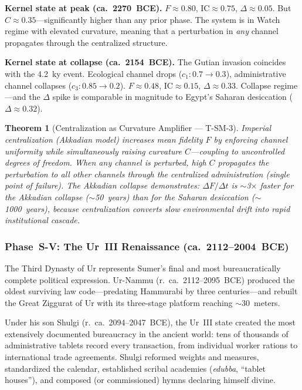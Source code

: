 \documentclass[
  aps,
  prd,
  twocolumn,
  superscriptaddress,
  nofootinbib,
  floatfix
]{revtex4-2}
\newtheorem{theorem}{Theorem}
\newcommand{\IC}{\mathrm{IC}}
\begin{document}
\textbf{Kernel state at peak (ca.\ 2270~BCE).}
$F \approx 0.80$, $\IC \approx 0.75$, $\Delta
\approx 0.05$.  But $C \approx 0.35$---significantly
higher than any prior phase.  The system is in Watch
regime with elevated curvature, meaning that a
perturbation in \emph{any} channel propagates through
the centralized structure.

\textbf{Kernel state at collapse (ca.\ 2154~BCE).}
The Gutian invasion coincides with the 4.2~ky event.
Ecological channel drops ($c_1: 0.7 \to 0.3$),
administrative channel collapses ($c_3: 0.85 \to
0.2$).  $F \approx 0.48$, $\IC \approx 0.15$,
$\Delta \approx 0.33$.  Collapse regime---and the
$\Delta$ spike is comparable in magnitude to Egypt's
Saharan desiccation ($\Delta \approx 0.32$).

\begin{theorem}[Centralization as Curvature
Amplifier --- T-SM-3]\label{thm:centralization}
Imperial centralization (Akkadian model) increases
mean fidelity $F$ by enforcing channel uniformity
while simultaneously raising curvature $C$---coupling
to uncontrolled degrees of freedom.  When any
channel is perturbed, high $C$ propagates the
perturbation to all other channels through the
centralized administration (single point of
failure).  The Akkadian collapse demonstrates:
$\Delta F / \Delta t$ is $\sim$3$\times$ faster for
the Akkadian collapse ($\sim$50~years) than for the
Saharan desiccation ($\sim$1000~years), because
centralization converts slow environmental drift
into rapid institutional cascade.
\end{theorem}


\subsubsection{Phase~S-V: The Ur~III Renaissance
(ca.\ 2112--2004~BCE)}\label{sec:uriii}

The Third Dynasty of Ur represents Sumer's final and
most bureaucratically complete political expression.
Ur-Nammu (r.\ ca.\ 2112--2095~BCE) produced the oldest
surviving law code---predating Hammurabi by three
centuries---and rebuilt the Great Ziggurat of Ur with
its three-stage platform reaching $\sim$30~meters.

Under his son Shulgi (r.\ ca.\ 2094--2047~BCE), the
Ur~III state created the most extensively documented
bureaucracy in the ancient world: tens of thousands
of administrative tablets record every transaction,
from individual worker rations to international trade
agreements.  Shulgi reformed weights and measures,
standardized the calendar, established scribal
academies (\emph{edubba}, ``tablet houses''), and
composed (or commissioned) hymns declaring himself
divine.
\end{document}
